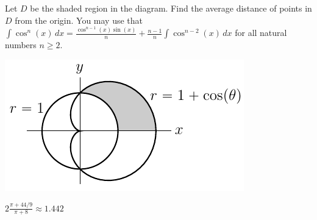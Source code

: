\begin{question}[M200 2000A] %
Let $D$ be the shaded region in the diagram. Find the average 
distance of points in $D$ from the origin. You may use that
$\int\cos^n(x)\,dx = \frac{\cos^{n-1}(x)\sin(x)}{n}
                        +\frac{n-1}{n}\int\cos^{n-2}(x)\,dx$
for all natural numbers $n\ge 2$.
\begin{center}
     \includegraphics{fig/OE00AQ8.pdf}
\end{center}
\end{question}

%

\begin{answer}
$2\frac{\pi+44/9}{\pi+8}\approx 1.442$
\end{answer}


